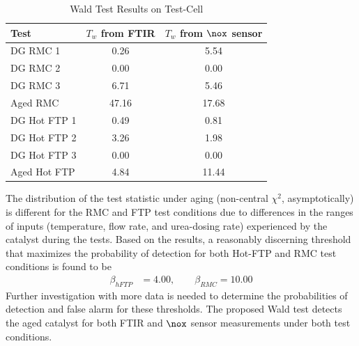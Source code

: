\begin{table}[ht]
        \centering
        \caption{Wald Test Results on Test-Cell}
        \label{tab::Tw_tst}
        \begin{tabular}{l c c}
        \hline \hline
        Test & $T_w$ from FTIR & $T_w$ from $\nox$ sensor \\\hline \hline
        DG RMC 1      & 0.26 & 5.54\\
        DG RMC 2      & 0.00 & 0.00\\
        DG RMC 3      & 6.71 & 5.46\\
        Aged RMC      & 47.16 & 17.68\\
        \hline
        DG Hot FTP 1  & 0.49 & 0.81\\
        DG Hot FTP 2  & 3.26 & 1.98\\
        DG Hot FTP 3  & 0.00 & 0.00\\
        Aged Hot FTP  & 4.84 & 11.44\\
        \hline \hline
        \end{tabular}
\end{table}
The distribution of the test statistic under aging (non-central $\chi^2$, asymptotically) is different for the RMC and FTP
test conditions due to differences in the ranges of inputs (temperature, flow rate, and urea-dosing rate) experienced
by the catalyst during the tests. Based on the results, a reasonably discerning threshold that maximizes the probability of detection for both Hot-FTP and RMC test conditions is found to be
\begin{align}
        \beta_{hFTP} &= 4.00, \qquad \beta_{RMC} = 10.00
\end{align}
Further investigation with more data is needed to determine the probabilities of detection and false alarm for these
thresholds. The proposed Wald test detects the aged catalyst for both FTIR and $\nox$ sensor measurements under both
test conditions.

